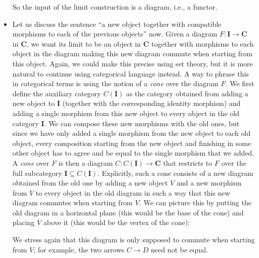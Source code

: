 \documentclass[12pt,a4paper]{amsart}
\theoremstyle{plain}
\theoremstyle{definition}
\theoremstyle{remark}
\begin{document}
\begin{itemize}
    So the input of the limit construction is a diagram, i.e., a functor.
  \item Let us discuss the sentence ``a new object together with compatible morphisms to each of the previous objects'' now.
    Given a diagram $F \colon \mathbf{I} \to \mathbf{C}$ in $\mathbf{C}$, we want its limit to be an object in $\mathbf{C}$ together with morphisms to  each object in the diagram making this new diagram commute when starting from this object.
    Again, we could make this precise using set theory, but it is more natural to continue using categorical language instead.
    A way to phrase this in categorical terms is using the notion of a \textit{cone} over the diagram $F$.
    We first define the auxiliary category $C(\mathbf{I})$ as the category obtained from adding a new object to $\mathbf{I}$ (together with the corresponding identity morphism) and adding a single morphism from this new object to every object in the old category $\mathbf{I}$.
    We can compose these new morphisms with the old ones, but since we have only added a single morphism from the new object to each old object, every composition starting from the new object and finishing in some other object has to agree and be equal to the single morphism that we added.
    A \textit{cone} over $F$ is then a diagram $C \colon C(\mathbf{I}) \to \mathbf{C}$ that restricts to $F$ over the full subcategory $\mathbf{I} \subseteq C(\mathbf{I})$.
    Explicitly, such a cone consists of a new diagram obtained from the old one by adding a new object $V$ and a new morphism from $V$ to every object in the old diagram in such a way that this new diagram commutes when starting from $V$.
    We can picture this by putting the old diagram in a horizontal plane (this would be the base of the cone) and placing $V$ above it (this would be the vertex of the cone):
    \begin{center}
    \end{center}
    We stress again that this diagram is only supposed to commute when starting from $V$; for example, the two arrows $C \to D$ need not be equal.
    

\end{itemize}
\end{document}
